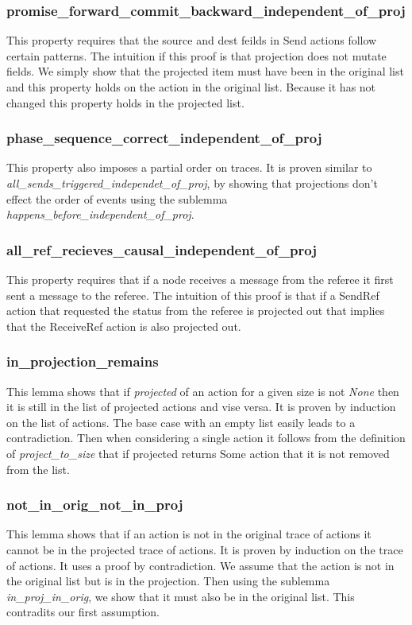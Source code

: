 \documentclass[runningheads]{llncs}
\begin{document}
\subsubsection{promise\_forward\_commit\_backward\_independent\_of\_proj}
This property requires that the source and dest feilds in Send actions follow certain patterns. The intuition if this proof is that projection does not mutate fields. We simply show that the projected item must have been in the original list and this property holds on the action in the original list. Because it has not changed this property holds in the projected list.

\subsubsection{phase\_sequence\_correct\_independent\_of\_proj}
This property also imposes a partial order on traces. It is proven similar to \emph{all\_sends\_triggered\_independet\_of\_proj}, by showing that projections don't effect the order of events using the sublemma \emph{happens\_before\_independent\_of\_proj}. 

\subsubsection{all\_ref\_recieves\_causal\_independent\_of\_proj}
This property requires that if a node receives a message from the referee it first sent a message to the referee. The intuition of this proof is that if a SendRef action that requested the status from the referee is projected out that implies that the ReceiveRef action is also projected out.

\subsubsection{in\_projection\_remains}
This lemma shows that if \emph{projected} of an action for a given size is not \emph{None} then it is still in the list of projected actions and vise versa. It is proven by induction on the list of actions. The base case with an empty list easily leads to a contradiction. Then when considering a single action it follows from the definition of \emph{project\_to\_size} that if projected returns Some action that it is not removed from the list. 

\subsubsection{not\_in\_orig\_not\_in\_proj}
This lemma shows that if an action is not in the original trace of actions it cannot be in the projected trace of actions. It is proven by induction on the trace of actions. It uses a proof by contradiction. We assume that the action is not in the original list but is in the projection. Then using the sublemma \emph{in\_proj\_in\_orig}, we show that it must also be in the original list. This contradits our first assumption.
\end{document}
